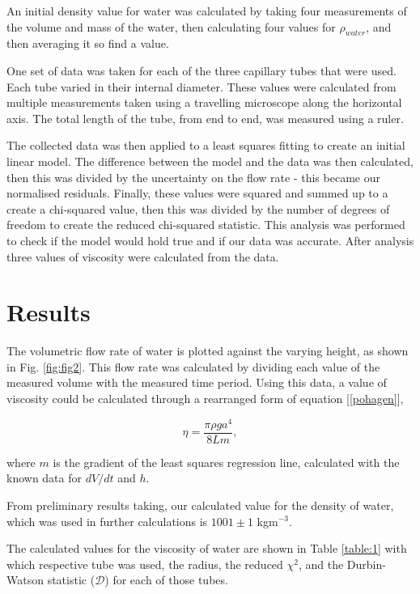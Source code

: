 \documentclass[twocolumn]{revtex4}
\begin{document}
An initial density value for water was calculated by taking four measurements of the volume and mass of the water, then calculating four values for $\rho_{water}$, and then averaging it so find a value. 

One set of data was taken for each of the three capillary tubes that were used. Each tube varied in their internal diameter. These values were calculated from multiple measurements taken using a travelling microscope along the horizontal axis. The total length of the tube, from end to end, was measured using a ruler. 

The collected data was then applied to a least squares fitting to create an initial linear model. The difference between the model and the data was then calculated, then this was divided by the uncertainty on the flow rate - this became our normalised residuals. Finally, these values were squared and summed up to a create a chi-squared value, then this was divided by the number of degrees of freedom to create the reduced chi-squared statistic. This analysis was performed to check if the model would hold true and if our data was accurate. After analysis three values of viscosity were calculated from the data. 

\vspace{-3ex}
\section{Results}
\vspace{-2ex}

The volumetric flow rate of water is plotted against the varying height, as shown in Fig. \ref{fig:fig2}. This flow rate was calculated by dividing each value of the measured volume with the measured time period. Using this data, a value of viscosity could be calculated through a rearranged form of equation [\ref{pohagen}],

\begin{equation} 
\eta=\frac{\pi \rho g a^4 }{8 L m}, 
\label{r-pohagen}
\end{equation}

where $m$ is the gradient of the least squares regression line, calculated with the known data for $dV/dt$ and $h$.

From preliminary results taking, our calculated value for the density of water, which was used in further calculations is ${1001 \pm 1}$ kgm$^{-3}$.

The calculated values for the viscosity of water are shown in Table \ref{table:1} with which respective tube was used, the radius, the reduced $\chi^2$, and the Durbin-Watson statistic ($\mathcal{D}$) for each of those tubes. 
\end{document}
